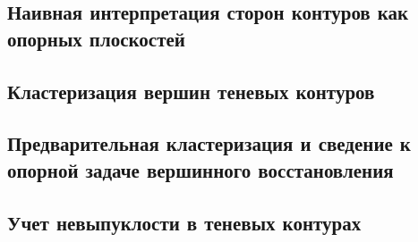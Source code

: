 \documentclass[a4paper, 12pt, titlepage]{article}
\theoremstyle{definition}
\theoremstyle{plain}
\theoremstyle{plain}
\begin{document}
\subsection{Наивная интерпретация сторон контуров как опорных плоскостей}

\subsection{Кластеризация вершин теневых контуров}

\subsection{Предварительная кластеризация и сведение к опорной задаче
вершинного восстановления}

\subsection{Учет невыпуклости в теневых контурах}



\newpage


\end{document}
